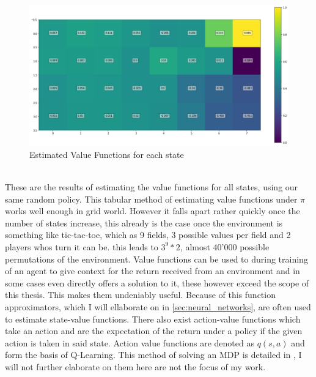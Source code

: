 \begin{figure}[h!]
    \centering
    \includegraphics[width=0.6\linewidth]{figures/state_values_under_pi.png}
    \caption{Estimated Value Functions for each state}
    \label{fig:value_functions_grid_world}
\end{figure}

\noindent
\\ These are the results of estimating the value functions for all states, using our same random policy. This tabular method of estimating value functions under $\pi$ works well enough in grid world. However it falls apart rather quickly once the number of states increase, this already is the case once the environment is something like tic-tac-toe, which as 9 fields, 3 possible values per field and 2 players whos turn it can be. this leads to $3^9 * 2$, almost 40'000 possible permutations of the environment. Value functions can be used to during training of an agent to give context for the return received from an environment and in some cases even directly offers a solution to it, these however exceed the scope of this thesis. This makes them undeniably useful. Because of this function approximators, which I will ellaborate on in \ref{sec:neural_networks}, are often used to estimate state-value functions. There also exist action-value functions which take an action and are the expectation of the return under a policy if the given action is taken in said state. Action value functions are denoted as $q(s, a)$ and form the basis of Q-Learning. This method of solving an MDP is detailed in , I will not further elaborate on them here are not the focus of my work.

\newpage
